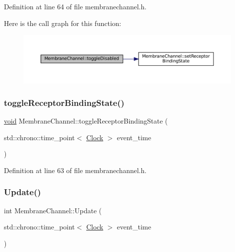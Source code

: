 Definition at line 64 of file membranechannel.\+h.

Here is the call graph for this function\+:\nopagebreak
\begin{figure}[H]
\begin{center}
\leavevmode
\includegraphics[width=350pt]{class_membrane_channel_aabbadec31782704dd497848154dfe0fc_cgraph}
\end{center}
\end{figure}
\mbox{\label{class_membrane_channel_a289ec477e64eec5d2a1f88f4a677650c}} 
\subsubsection{\texorpdfstring{toggle\+Receptor\+Binding\+State()}{toggleReceptorBindingState()}}
{\footnotesize\ttfamily \mbox{\hyperlink{glad_8h_a950fc91edb4504f62f1c577bf4727c29}{void}} Membrane\+Channel\+::toggle\+Receptor\+Binding\+State (\begin{DoxyParamCaption}\item[{std\+::chrono\+::time\+\_\+point$<$ \mbox{\hyperlink{universe_8h_a0ef8d951d1ca5ab3cfaf7ab4c7a6fd80}{Clock}} $>$}]{event\+\_\+time }\end{DoxyParamCaption})\hspace{0.3cm}{\ttfamily [inline]}}



Definition at line 63 of file membranechannel.\+h.

\mbox{\label{class_membrane_channel_a34077828eee1c2457212f05217b09d6c}} 
\subsubsection{\texorpdfstring{Update()}{Update()}}
{\footnotesize\ttfamily int Membrane\+Channel\+::\+Update (\begin{DoxyParamCaption}\item[{std\+::chrono\+::time\+\_\+point$<$ \mbox{\hyperlink{universe_8h_a0ef8d951d1ca5ab3cfaf7ab4c7a6fd80}{Clock}} $>$}]{event\+\_\+time }\end{DoxyParamCaption})}



